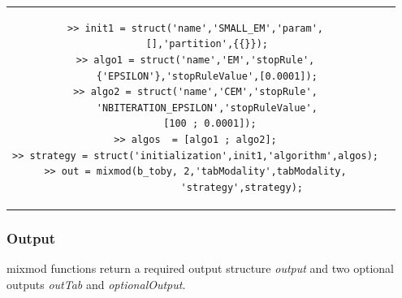 \begin{itemize}
\begin{itemize}
\begin{tabular}{c|c}
\begin{minipage}[c]{0.54\columnwidth}
{\begin{verbatim}
>> init1 = struct('name','SMALL_EM','param',
    [],'partition',{{}});
>> algo1 = struct('name','EM','stopRule',
    {'EPSILON'},'stopRuleValue',[0.0001]);
>> algo2 = struct('name','CEM','stopRule',
    'NBITERATION_EPSILON','stopRuleValue',
     [100 ; 0.0001]);
>> algos  = [algo1 ; algo2];
>> strategy = struct('initialization',init1,'algorithm',algos);
>> out = mixmod(b_toby, 2,'tabModality',tabModality,
                'strategy',strategy);

\end{verbatim}}
\end{minipage}%
\end{tabular}

\end{itemize}


\end{itemize}

\subsubsection{Output}
{\sc mixmod} functions return a required output structure {\em output} and two optional outputs {\em outTab} and {\em optionalOutput}.
